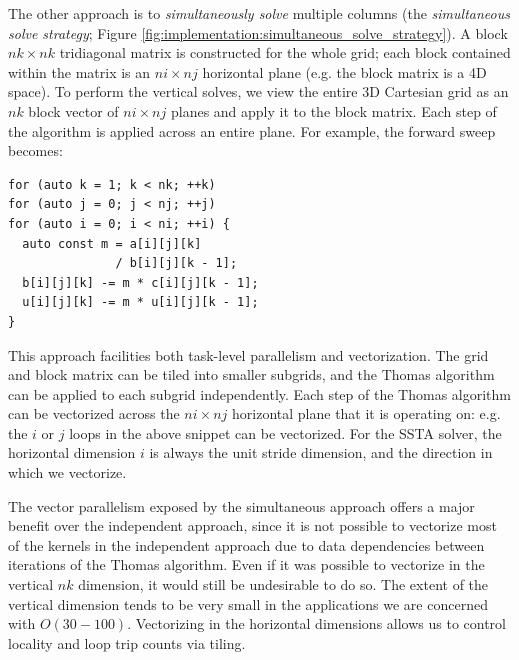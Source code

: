\documentclass{sig-alternate-05-2015}
\begin{document}
The other approach is to \emph{simultaneously solve} multiple columns (the
  \emph{simultaneous solve strategy}; Figure
  \ref{fig:implementation:simultaneous_solve_strategy}).
A block \(nk \times nk\) tridiagonal matrix is constructed for the whole grid;
  each block contained within the matrix is an \(ni \times nj\) horizontal plane
  (e.g. the block matrix is a 4D space).
To perform the vertical solves, we view the entire 3D Cartesian grid as an
  \(nk\) block vector of \(ni \times nj\) planes and apply it to the block
  matrix.
Each step of the algorithm is applied across an entire plane.
For example, the forward sweep becomes:
\begin{lstlisting}
for (auto k = 1; k < nk; ++k)
for (auto j = 0; j < nj; ++j)
for (auto i = 0; i < ni; ++i) {
  auto const m = a[i][j][k]
               / b[i][j][k - 1];
  b[i][j][k] -= m * c[i][j][k - 1];
  u[i][j][k] -= m * u[i][j][k - 1];
} 
\end{lstlisting}
This approach facilities both task-level parallelism and vectorization.
The grid and block matrix can be tiled into smaller subgrids, and the Thomas
  algorithm can be applied to each subgrid independently.
Each step of the Thomas algorithm can be vectorized across the \(ni \times nj\)
  horizontal plane that it is operating on: e.g. the \(i\) or \(j\) loops in the
  above snippet can be vectorized.
For the SSTA solver, the horizontal dimension \(i\) is always the unit stride
  dimension, and the direction in which we vectorize.


The vector parallelism exposed by the simultaneous approach offers a major
  benefit over the independent approach, since it is not possible to vectorize
  most of the kernels in the independent approach due to data dependencies
  between iterations of the Thomas algorithm.
Even if it was possible to vectorize in the vertical \(nk\) dimension, it would
  still be undesirable to do so.
The extent of the vertical dimension tends to be very small in the applications
  we are concerned with \(O(30-100)\).
Vectorizing in the horizontal dimensions allows us to control locality and loop
  trip counts via tiling.
\end{document}
